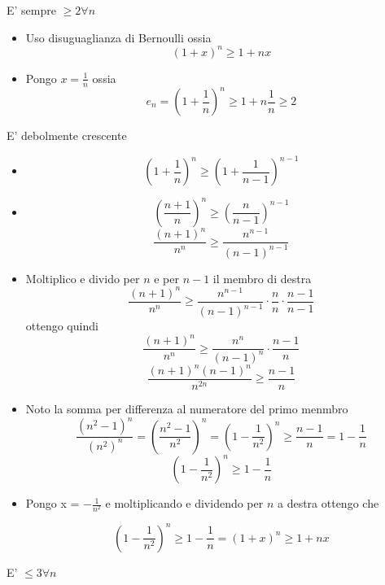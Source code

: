  E' sempre $\ge 2 \forall n$
\begin{itemize}
	\item Uso disuguaglianza di Bernoulli ossia 
	\[
	\left( 1+x \right) ^{n} \ge 1+ nx
	\] 
	\item Pongo $x=\frac{1}{n}$ ossia 
	\[
	e_n = \left( 1+\frac{1}{n} \right) ^{n} \ge 1 + n \frac{1}{n} \ge 2
	\] 
\end{itemize}
E' debolmente crescente
\begin{itemize}
	\item \[
	\left( 1+\frac{1}{n} \right)^{n} \ge \left( 1 + \frac{1}{n-1} \right) ^{n-1}
	\] 
	\item \[
	\left( \frac{n+1}{n} \right) ^{n} \ge \left( \frac{n}{n-1} \right) ^{n-1}
	\] 
	\[
	\frac{\left( n+1 \right) ^{n}}{n^{n}} \ge \frac{n^{n-1}}{\left( n-1 \right) ^{n-1}}
	\] 
	\item Moltiplico e divido per $n$ e per $n-1$ il membro di destra
	\[
	\frac{\left( n+1 \right) ^{n}}{n^{n}} \ge \frac{n^{n-1}}{\left( n-1 \right) ^{n-1}} \cdot \frac{n}{n} \cdot \frac{n-1}{n-1}
	\] 
	ottengo quindi
	\[
	\frac{\left( n+1 \right) ^{n}}{n^{n}}\ge \frac{n^{n}}{\left( n-1 \right) ^{n}}\cdot \frac{n-1}{n}
	\] 
	\[
	\frac{\left( n+1 \right) ^{n} \left( n-1 \right) ^{n}}{n^{2n}} \ge \frac{n-1}{n}
	\] 
	\item Noto la somma per differenza al numeratore del primo menmbro
	\[
	\frac{\left( n^2-1 \right) ^{n}}{\left( n^2 \right) ^{n}} = \left( \frac{n^2-1}{n^2} \right) ^{n} = \left( 1 - \frac{1}{n^{2}} \right)^{n}\ge \frac{n-1}{n} = 1 - \frac{1}{n}
	\] 
	\[
	\left( 1 - \frac{1}{n^{2}} \right)^{n} \ge   1 - \frac{1}{n}
	\] 
	\item Pongo x = $-\frac{1}{n^2}$ e moltiplicando e dividendo per $n$ a destra ottengo che

	\[
	\left( 1-\frac{1}{n^2} \right) ^{n} \ge 1- \frac{1}{n} = \left( 1+x \right) ^{n} \ge 1+ nx
	\] 
\end{itemize}
E' $\le 3 \forall n$
